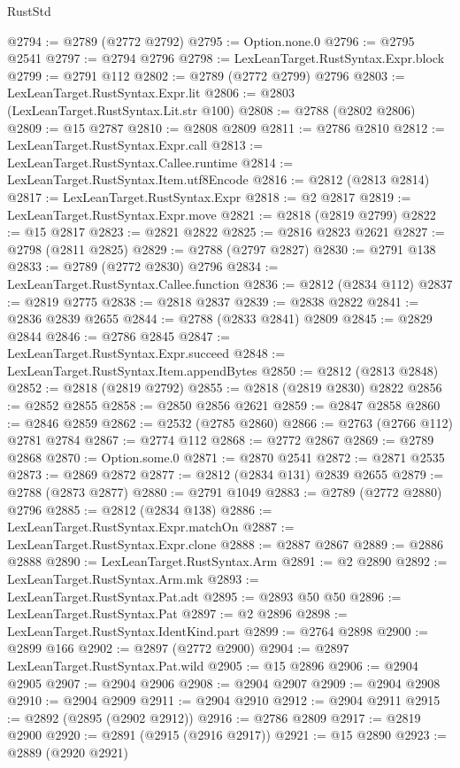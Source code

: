 \begin{lexlean}{RustStd}
\begin{coremodule}
@2794 := @2789 (@2772 @2792)
@2795 := Option.none.{0}
@2796 := @2795 @2541
@2797 := @2794 @2796
@2798 := LexLeanTarget.RustSyntax.Expr.block
@2799 := @2791 @112
@2802 := @2789 (@2772 @2799) @2796
@2803 := LexLeanTarget.RustSyntax.Expr.lit
@2806 := @2803 (LexLeanTarget.RustSyntax.Lit.str @100)
@2808 := @2788 (@2802 @2806)
@2809 := @15 @2787
@2810 := @2808 @2809
@2811 := @2786 @2810
@2812 := LexLeanTarget.RustSyntax.Expr.call
@2813 := LexLeanTarget.RustSyntax.Callee.runtime
@2814 := LexLeanTarget.RustSyntax.Item.utf8Encode
@2816 := @2812 (@2813 @2814)
@2817 := LexLeanTarget.RustSyntax.Expr
@2818 := @2 @2817
@2819 := LexLeanTarget.RustSyntax.Expr.move
@2821 := @2818 (@2819 @2799)
@2822 := @15 @2817
@2823 := @2821 @2822
@2825 := @2816 @2823 @2621
@2827 := @2798 (@2811 @2825)
@2829 := @2788 (@2797 @2827)
@2830 := @2791 @138
@2833 := @2789 (@2772 @2830) @2796
@2834 := LexLeanTarget.RustSyntax.Callee.function
@2836 := @2812 (@2834 @112)
@2837 := @2819 @2775
@2838 := @2818 @2837
@2839 := @2838 @2822
@2841 := @2836 @2839 @2655
@2844 := @2788 (@2833 @2841) @2809
@2845 := @2829 @2844
@2846 := @2786 @2845
@2847 := LexLeanTarget.RustSyntax.Expr.succeed
@2848 := LexLeanTarget.RustSyntax.Item.appendBytes
@2850 := @2812 (@2813 @2848)
@2852 := @2818 (@2819 @2792)
@2855 := @2818 (@2819 @2830) @2822
@2856 := @2852 @2855
@2858 := @2850 @2856 @2621
@2859 := @2847 @2858
@2860 := @2846 @2859
@2862 := @2532 (@2785 @2860)
@2866 := @2763 (@2766 @112) @2781 @2784
@2867 := @2774 @112
@2868 := @2772 @2867
@2869 := @2789 @2868
@2870 := Option.some.{0}
@2871 := @2870 @2541
@2872 := @2871 @2535
@2873 := @2869 @2872
@2877 := @2812 (@2834 @131) @2839 @2655
@2879 := @2788 (@2873 @2877)
@2880 := @2791 @1049
@2883 := @2789 (@2772 @2880) @2796
@2885 := @2812 (@2834 @138)
@2886 := LexLeanTarget.RustSyntax.Expr.matchOn
@2887 := LexLeanTarget.RustSyntax.Expr.clone
@2888 := @2887 @2867
@2889 := @2886 @2888
@2890 := LexLeanTarget.RustSyntax.Arm
@2891 := @2 @2890
@2892 := LexLeanTarget.RustSyntax.Arm.mk
@2893 := LexLeanTarget.RustSyntax.Pat.adt
@2895 := @2893 @50 @50
@2896 := LexLeanTarget.RustSyntax.Pat
@2897 := @2 @2896
@2898 := LexLeanTarget.RustSyntax.IdentKind.part
@2899 := @2764 @2898
@2900 := @2899 @166
@2902 := @2897 (@2772 @2900)
@2904 := @2897 LexLeanTarget.RustSyntax.Pat.wild
@2905 := @15 @2896
@2906 := @2904 @2905
@2907 := @2904 @2906
@2908 := @2904 @2907
@2909 := @2904 @2908
@2910 := @2904 @2909
@2911 := @2904 @2910
@2912 := @2904 @2911
@2915 := @2892 (@2895 (@2902 @2912))
@2916 := @2786 @2809
@2917 := @2819 @2900
@2920 := @2891 (@2915 (@2916 @2917))
@2921 := @15 @2890
@2923 := @2889 (@2920 @2921)

\end{coremodule}
\end{lexlean}

